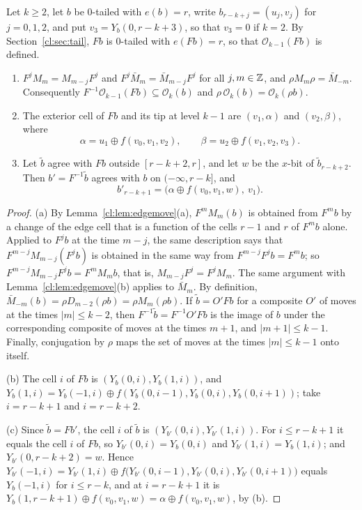 \begin{lemma}[transfer]\label{cl:lem:transfer}
Let $k\ge2$, let $b$ be $0$-tailed with $e(b)=r$, write $b_{r-k+j}=(u_j,v_j)$ for $j=0,1,2$, and put $v_3=Y_b(0,r-k+3)$, so that $v_3=0$ if $k=2$. By Section~\ref{cl:sec:tail}, $Fb$ is $0$-tailed with $e(Fb)=r$, so that $\mathcal O_{k-1}(Fb)$ is defined.
\begin{enumerate}
\item[(a)] $F^jM_m=M_{m-j}F^j$ and $F^j\bar M_m=\bar M_{m-j}F^j$ for all $j,m\in\mathbb{Z}$, and $\rho M_m\rho=\bar M_{-m}$. Consequently $F^{-1}\mathcal O_{k-1}(Fb)\subseteq\mathcal O_k(b)$ and $\rho\,\mathcal O_k(b)=\mathcal O_k(\rho b)$.
\item[(b)] The exterior cell of $Fb$ and its tip at level $k-1$ are $(v_1,\alpha)$ and $(v_2,\beta)$, where
\[
\alpha=u_1\oplus f(v_0,v_1,v_2),\qquad \beta=u_2\oplus f(v_1,v_2,v_3).
\]
\item[(c)] Let $\tilde b$ agree with $Fb$ outside $[r-k+2,r]$, and let $w$ be the $x$-bit of $\tilde b_{r-k+2}$. Then $b'=F^{-1}\tilde b$ agrees with $b$ on $(-\infty,r-k]$, and
\[
b'_{r-k+1}=\bigl(\alpha\oplus f(v_0,v_1,w),\ v_1\bigr).
\]
\end{enumerate}
\end{lemma}

\begin{proof}
(a) By Lemma~\ref{cl:lem:edgemove}(a), $F^mM_m(b)$ is obtained from $F^mb$ by a change of the edge cell that is a function of the cells $r-1$ and $r$ of $F^mb$ alone. Applied to $F^jb$ at the time $m-j$, the same description says that $F^{m-j}M_{m-j}(F^jb)$ is obtained in the same way from $F^{m-j}F^jb=F^mb$; so $F^{m-j}M_{m-j}F^jb=F^mM_mb$, that is, $M_{m-j}F^j=F^jM_m$. The same argument with Lemma~\ref{cl:lem:edgemove}(b) applies to $\bar M_m$. By definition, $\bar M_{-m}(b)=\rho D_{m-2}(\rho b)=\rho M_m(\rho b)$. If $\tilde b=O'Fb$ for a composite $O'$ of moves at the times $|m|\le k-2$, then $F^{-1}\tilde b=F^{-1}O'Fb$ is the image of $b$ under the corresponding composite of moves at the times $m+1$, and $|m+1|\le k-1$. Finally, conjugation by $\rho$ maps the set of moves at the times $|m|\le k-1$ onto itself.

(b) The cell $i$ of $Fb$ is $(Y_b(0,i),Y_b(1,i))$, and $Y_b(1,i)=Y_b(-1,i)\oplus f(Y_b(0,i-1),Y_b(0,i),Y_b(0,i+1))$; take $i=r-k+1$ and $i=r-k+2$.

(c) Since $\tilde b=Fb'$, the cell $i$ of $\tilde b$ is $(Y_{b'}(0,i),Y_{b'}(1,i))$. For $i\le r-k+1$ it equals the cell $i$ of $Fb$, so $Y_{b'}(0,i)=Y_b(0,i)$ and $Y_{b'}(1,i)=Y_b(1,i)$; and $Y_{b'}(0,r-k+2)=w$. Hence $Y_{b'}(-1,i)=Y_{b'}(1,i)\oplus f\bigl(Y_{b'}(0,i-1),Y_{b'}(0,i),Y_{b'}(0,i+1)\bigr)$ equals $Y_b(-1,i)$ for $i\le r-k$, and at $i=r-k+1$ it is $Y_b(1,r-k+1)\oplus f(v_0,v_1,w)=\alpha\oplus f(v_0,v_1,w)$, by (b).
\end{proof}

